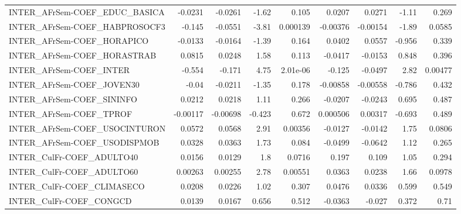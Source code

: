\begin{tabular}{lrrrrrrrr}
INTER\_AFrSem-COEF\_EDUC\_BASICA         &     -0.0231 &      -0.0261 &   -1.62 &    0.105 &     0.0207 &      0.0271 &        -1.11 &         0.269 \\
INTER\_AFrSem-COEF\_HABPROSOCF3         &      -0.145 &      -0.0551 &   -3.81 & 0.000139 &   -0.00376 &    -0.00154 &        -1.89 &        0.0585 \\
INTER\_AFrSem-COEF\_HORAPICO            &     -0.0133 &      -0.0164 &   -1.39 &    0.164 &     0.0402 &      0.0557 &       -0.956 &         0.339 \\
INTER\_AFrSem-COEF\_HORASTRAB           &      0.0815 &       0.0248 &    1.58 &    0.113 &    -0.0417 &     -0.0153 &        0.848 &         0.396 \\
INTER\_AFrSem-COEF\_INTER               &      -0.554 &       -0.171 &    4.75 & 2.01e-06 &     -0.125 &     -0.0497 &         2.82 &       0.00477 \\
INTER\_AFrSem-COEF\_JOVEN30             &       -0.04 &      -0.0211 &   -1.35 &    0.178 &   -0.00858 &    -0.00558 &       -0.786 &         0.432 \\
INTER\_AFrSem-COEF\_SININFO             &      0.0212 &       0.0218 &    1.11 &    0.266 &    -0.0207 &     -0.0243 &        0.695 &         0.487 \\
INTER\_AFrSem-COEF\_TPROF               &    -0.00117 &     -0.00698 &  -0.423 &    0.672 &   0.000506 &     0.00317 &       -0.693 &         0.489 \\
INTER\_AFrSem-COEF\_USOCINTURON         &      0.0572 &       0.0568 &    2.91 &  0.00356 &    -0.0127 &     -0.0142 &         1.75 &        0.0806 \\
INTER\_AFrSem-COEF\_USODISPMOB          &      0.0328 &       0.0363 &    1.73 &    0.084 &    -0.0499 &     -0.0642 &         1.12 &         0.265 \\
INTER\_CulFr-COEF\_ADULTO40             &      0.0156 &       0.0129 &     1.8 &   0.0716 &      0.197 &       0.109 &         1.05 &         0.294 \\
INTER\_CulFr-COEF\_ADULTO60             &     0.00263 &      0.00255 &    2.78 &  0.00551 &     0.0363 &      0.0238 &         1.66 &        0.0978 \\
INTER\_CulFr-COEF\_CLIMASECO            &      0.0208 &       0.0226 &    1.02 &    0.307 &     0.0476 &      0.0336 &        0.599 &         0.549 \\
INTER\_CulFr-COEF\_CONGCD               &      0.0139 &       0.0167 &   0.656 &    0.512 &    -0.0363 &      -0.027 &        0.372 &          0.71 \\

\end{tabular}
